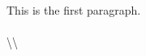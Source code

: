 \documentclass[11pt,fleqn,a4paper,twocolumn,draft]{article}
\begin{document}
This is the first paragraph.\\
\\
\textbackslash\textbackslash
\end{document}
